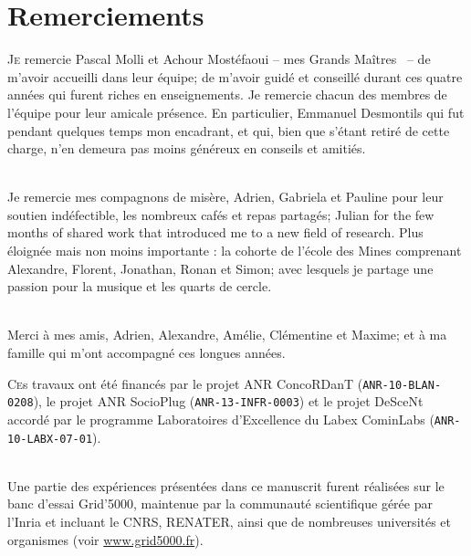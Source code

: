 
\chapter*{Remerciements}

\lettrine{J}e remercie Pascal Molli et Achour Mostéfaoui -- mes \og Grands
Maîtres \fg~-- de m'avoir accueilli dans leur équipe; de m'avoir guidé et
conseillé durant ces quatre années qui furent riches en enseignements. Je
remercie chacun des membres de l'équipe pour leur amicale présence. En
particulier, Emmanuel Desmontils qui fut pendant quelques temps mon encadrant,
et qui, bien que s'étant retiré de cette charge, n'en demeura pas moins généreux
en conseils et amitiés.

\ \\

Je remercie mes compagnons de misère, Adrien, Gabriela et Pauline pour leur
soutien indéfectible, les nombreux cafés et repas partagés; Julian for the few
months of shared work that introduced me to a new field of research. Plus
éloignée mais non moins importante : la cohorte de l'école des Mines comprenant
Alexandre, Florent, Jonathan, Ronan et Simon; avec lesquels je partage une
passion pour la musique et les quarts de cercle.

\ \\

Merci à mes amis, Adrien, Alexandre, Amélie, Clémentine et Maxime; et à ma
famille qui m'ont accompagné ces longues années.

\vfill

\lettrine{C}es travaux ont été %
financés par le projet ANR ConcoRDanT (\texttt{ANR-10-BLAN-0208}), le projet ANR
SocioPlug (\texttt{ANR-13-INFR-0003}) et le projet DeSceNt accordé par le
programme \og Laboratoires d'Excellence \fg du Labex CominLabs
(\texttt{ANR-10-LABX-07-01}).

\ \\

Une partie des expériences présentées dans ce manuscrit furent réalisées sur le
banc d'essai Grid'5000, maintenue par la communauté scientifique gérée par
l'Inria et incluant le CNRS, RENATER, ainsi que de nombreuses universités et
organismes (voir \url{www.grid5000.fr}).



